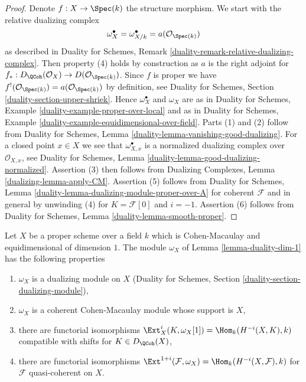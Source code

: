 \begin{proof}
Denote $f : X \to \Spec(k)$ the structure morphism.
We start with the relative dualizing complex
$$
\omega_X^\bullet = \omega_{X/k}^\bullet = a(\mathcal{O}_{\Spec(k)})
$$
as described in Duality for Schemes,
Remark \ref{duality-remark-relative-dualizing-complex}.
Then property (4) holds by construction as $a$ is the right
adjoint for $f_* : D_\QCoh(\mathcal{O}_X) \to D(\mathcal{O}_{\Spec(k)})$.
Since $f$ is proper we have
$f^!(\mathcal{O}_{\Spec(k)}) = a(\mathcal{O}_{\Spec(k)})$ by
definition, see
Duality for Schemes, Section \ref{duality-section-upper-shriek}.
Hence $\omega_X^\bullet$ and $\omega_X$ are as in
Duality for Schemes, Example \ref{duality-example-proper-over-local}
and as in
Duality for Schemes, Example \ref{duality-example-equidimensional-over-field}.
Parts (1) and (2) follow from
Duality for Schemes, Lemma \ref{duality-lemma-vanishing-good-dualizing}.
For a closed point $x \in X$ we see that $\omega_{X, x}^\bullet$ is a
normalized dualizing complex over $\mathcal{O}_{X, x}$, see
Duality for Schemes, Lemma \ref{duality-lemma-good-dualizing-normalized}.
Assertion (3) then follows from
Dualizing Complexes, Lemma \ref{dualizing-lemma-apply-CM}.
Assertion (5) follows from
Duality for Schemes, Lemma \ref{duality-lemma-dualizing-module-proper-over-A}
for coherent $\mathcal{F}$ and in general by unwinding
(4) for $K = \mathcal{F}[0]$ and $i = -1$.
Assertion (6) follows from Duality for Schemes,
Lemma \ref{duality-lemma-smooth-proper}.
\end{proof}

\begin{lemma}
\label{lemma-duality-dim-1-CM}
Let $X$ be a proper scheme over a field $k$ which is Cohen-Macaulay
and equidimensional of dimension $1$. The module $\omega_X$
of Lemma \ref{lemma-duality-dim-1} has the following properties
\begin{enumerate}
\item $\omega_X$ is a dualizing module on $X$
(Duality for Schemes, Section \ref{duality-section-dualizing-module}),
\item $\omega_X$ is a coherent Cohen-Macaulay module whose support is $X$,
\item there are functorial isomorphisms
$\Ext^i_X(K, \omega_X[1]) = \Hom_k(H^{-i}(X, K), k)$
compatible with shifts for $K \in D_\QCoh(X)$,
\item there are functorial isomorphisms
$\Ext^{1 + i}(\mathcal{F}, \omega_X) = \Hom_k(H^{-i}(X, \mathcal{F}), k)$
for $\mathcal{F}$ quasi-coherent on $X$.
\end{enumerate}
\end{lemma}

